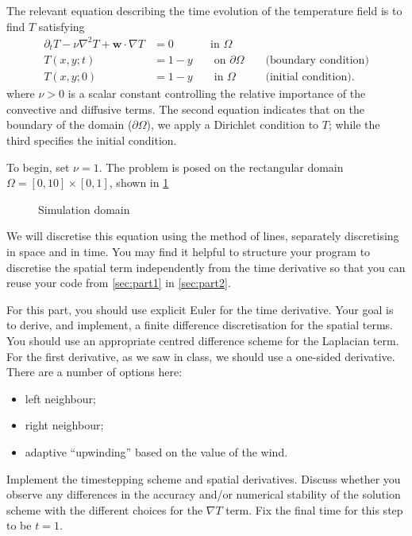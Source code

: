 \documentclass[11pt,a4paper]{article}
\renewcommand{\vec}[1]{\ensuremath{\mathbf{#1}}}
\begin{document}
The relevant equation describing the time evolution of the temperature
field is to find $T$ satisfying
\begin{equation}
  \label{eq:1}
  \begin{aligned}
  \partial_t T - \nu \nabla^2 T + \vec{w} \cdot \nabla T &= 0 &&\text{
    in } \Omega &&\\
  T(x, y; t) &= 1 - y &&\text{ on } \partial\Omega &&\text{ (boundary
    condition)}\\
  T(x, y; 0) &= 1 - y &&\text{ in } \Omega &&\text { (initial condition)}.
  \end{aligned}
\end{equation}
where $\nu > 0$ is a scalar constant controlling the relative
importance of the convective and diffusive terms. The second equation
indicates that on the boundary of the domain ($\partial\Omega$), we
apply a Dirichlet condition to $T$; while the third specifies the
initial condition.

To begin, set $\nu = 1$. The problem is posed on the rectangular
domain $\Omega = [0, 10] \times [0, 1]$, shown in \cref{fig:omega}
\begin{figure}[htbp]
  \centering
  \caption{Simulation domain}
  \label{fig:omega}
\end{figure}

We will discretise this equation using the method of lines, separately
discretising in space and in time. You may find it helpful to
structure your program to discretise the spatial term independently
from the time derivative so that you can reuse your code from
\cref{sec:part1} in \cref{sec:part2}.

For this part, you should use explicit Euler for the time derivative.
Your goal is to derive, and implement, a finite difference
discretisation for the spatial terms. You should use an appropriate
centred difference scheme for the Laplacian term. For the first
derivative, as we saw in class, we should use a one-sided derivative.
There are a number of options here:
\begin{itemize}
\item left neighbour;
\item right neighbour;
\item adaptive ``upwinding'' based on the value of the wind.
\end{itemize}
Implement the timestepping scheme and spatial derivatives. Discuss
whether you observe any differences in the accuracy and/or numerical
stability of the solution scheme with the different choices for the
$\nabla T$ term. Fix the final time for this step to be $t=1$.
\end{document}
